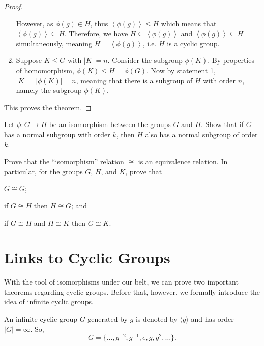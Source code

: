 \begin{proof}
\begin{enumerate}
        However, as $\phi(g) \in H$, thus $\left\langle \phi(g) \right\rangle \leq H$ which means that $\left\langle \phi(g) \right\rangle \subseteq H$. Therefore, we have $H \subseteq \left\langle \phi(g) \right\rangle$ and $\left\langle \phi(g) \right\rangle \subseteq H$ simultaneously, meaning $H = \left\langle \phi(g) \right\rangle$, i.e. $H$ is a cyclic group.

        \item Suppose $K \leq G$ with $|K| = n$. Consider the subgroup $\phi(K)$. By properties of homomorphism, $\phi(K) \leq H = \phi(G)$. Now by statement 1, $|K| = |\phi(K)| = n$, meaning that there is a subgroup of $H$ with order $n$, namely the subgroup $\phi(K)$.
    \end{enumerate}

    This proves the theorem.
\end{proof}

\begin{exercise}
    Let $\phi: G \to H$ be an isomorphism between the groups $G$ and $H$. Show that if $G$ has a normal subgroup with order $k$, then $H$ also has a normal subgroup of order $k$.
\end{exercise}

\begin{exercise}
    Prove that the ``isomorphism'' relation $\cong$ is an equivalence relation. In particular, for the groups $G$, $H$, and $K$, prove that
    \begin{partquestions}{\alph*}
        \item $G \cong G$;
        \item if $G \cong H$ then $H \cong G$; and
        \item if $G \cong H$ and $H \cong K$ then $G \cong K$.
    \end{partquestions}
\end{exercise}

\section{Links to Cyclic Groups}
With the tool of isomorphisms under our belt, we can prove two important theorems regarding cyclic groups. Before that, however, we formally introduce the idea of infinite cyclic groups.
\begin{definition}
    An infinite cyclic group $G$ generated by $g$ is denoted by $\langle g \rangle$ and has order $|G| = \infty$. So,
    \[
        G = \{\dots, g^{-2}, g^{-1}, e, g, g^2, \dots\}.
    \]
\end{definition}

